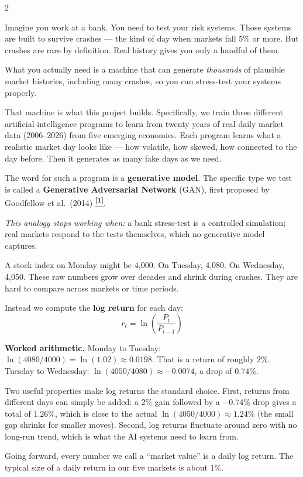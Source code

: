 \documentclass[10pt]{article}
\newcommand{\navybox}[2]{\begin{tcolorbox}[mybox={Navy}{LBg},title={#1}]#2\end{tcolorbox}}
\newcommand{\tcite}[1]{%
  \hyperlink{R:#1}{\textsuperscript{\scriptsize\textbf{[#1]}}}}
\begin{document}
\begin{multicols}{2}

\navybox{1\quad What We Are Trying to Build}{%
Imagine you work at a bank. You need to test your risk systems. Those systems are built to survive crashes --- the kind of day when markets fall 5\% or more. But crashes are rare by definition. Real history gives you only a handful of them.

What you actually need is a machine that can generate \emph{thousands} of plausible market histories, including many crashes, so you can stress-test your systems properly.

That machine is what this project builds. Specifically, we train three different artificial-intelligence programs to learn from twenty years of real daily market data (2006--2026) from five emerging economies. Each program learns what a realistic market day looks like --- how volatile, how skewed, how connected to the day before. Then it generates as many fake days as we need.

The word for such a program is a \textbf{generative model}. The specific type we test is called a \textbf{Generative Adversarial Network} (GAN), first proposed by Goodfellow et al.\ (2014)\tcite{1}.

\smallskip
\textit{This analogy stops working when:} a bank stress-test is a controlled simulation; real markets respond to the tests themselves, which no generative model captures.}

\columnbreak

\navybox{2\quad Prices, and Why We Study Changes}{%
A stock index on Monday might be 4{,}000. On Tuesday, 4{,}080. On Wednesday, 4{,}050. These raw numbers grow over decades and shrink during crashes. They are hard to compare across markets or time periods.

Instead we compute the \textbf{log return} for each day:
\begin{equation*}
  r_t = \ln\!\left(\frac{P_t}{P_{t-1}}\right)
\end{equation*}

\textbf{Worked arithmetic.} Monday to Tuesday: $\ln(4080/4000) = \ln(1.02) \approx 0.0198$. That is a return of roughly $2\%$. Tuesday to Wednesday: $\ln(4050/4080) \approx -0.0074$, a drop of $0.74\%$.

Two useful properties make log returns the standard choice.
First, returns from different days can simply be added: a $2\%$ gain followed by a $-0.74\%$ drop gives a total of $1.26\%$, which is close to the actual $\ln(4050/4000) \approx 1.24\%$ (the small gap shrinks for smaller moves).
Second, log returns fluctuate around zero with no long-run trend, which is what the AI systems need to learn from.

\smallskip
Going forward, every number we call a ``market value'' is a daily log return. The typical size of a daily return in our five markets is about $1\%$.}

\end{multicols}
\end{document}

